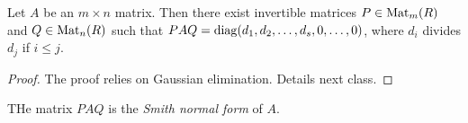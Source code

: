 \begin{prop}
  Let $A$ be an $m \times n$ matrix. Then there exist
  invertible matrices $P \in \operatorname{Mat}_m(R)$ and
  $Q \in \operatorname{Mat}_n(R)$ such that $PAQ = \operatorname{diag}(d_1, d_2, \dots, d_s, 0, \dots, 0)$,
  where $d_i$ divides $d_j$ if $i \le j$.
\end{prop}

\begin{proof}
  The proof relies on Gaussian elimination. Details
  next class.
\end{proof}

\begin{definition}
  THe matrix $PAQ$ is the \emph{Smith normal form}
  of $A$.
\end{definition}
